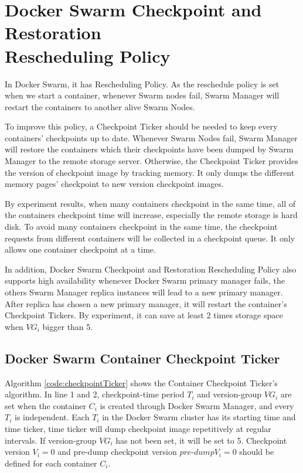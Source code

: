 \section{Docker Swarm Checkpoint and Restoration \\Rescheduling Policy}
\label{sec:checkpoint restore rescheduling policy}
In Docker Swarm, it has Rescheduling Policy. As the reschedule policy is set when we start a container, whenever Swarm nodes fail, Swarm Manager will restart the containers to another alive Swarm Nodes.

To improve this policy, a Checkpoint Ticker should be needed to keep every containers' checkpoints up to date.
Whenever Swarm Nodes fail, Swarm Manager will restore the containers which their checkpoints have been dumped by Swarm Manager to the remote storage server.
Otherwise, the Checkpoint Ticker provides the version of checkpoint image by tracking memory. It only dumps the different memory pages' checkpoint to new version checkpoint images.

By experiment results, when many containers checkpoint in the same time, all of the containers checkpoint time will increase, especially the remote storage is hard disk.
To avoid many containers checkpoint in the same time, the checkpoint requests from different containers will be collected in a checkpoint queue.
It only allows one container checkpoint at a time.

In addition, Docker Swarm Checkpoint and Restoration Rescheduling Policy also supports high availability whenever Docker Swarm primary manager fails, the others Swarm Manager replica instances will lead to a new primary manager. After replica has chosen a new primary manager, it will restart the container's Checkpoint Tickers.
By experiment, it can save at least 2 times storage space when $VG_i$ bigger than 5.

\subsection{Docker Swarm Container Checkpoint Ticker}
Algorithm \ref{code:checkpointTicker} shows the Container Checkpoint Ticker's algorithm.
In line 1 and 2, checkpoint-time period $T_i$ and version-group $VG_i$ are set when the container $C_i$ is created through Docker Swarm Manager, and every $T_i$ is independent.
Each $T_i$ in the Docker Swarm cluster has its starting time and time ticker, time ticker will dump checkpoint image repetitively at regular intervals. If version-group $VG_i$ has not been set, it will be set to 5.
Checkpoint version $V_i=0$ and pre-dump checkpoint version $pre$-$dump V_i=0$ should be defined for each container $C_i$.

